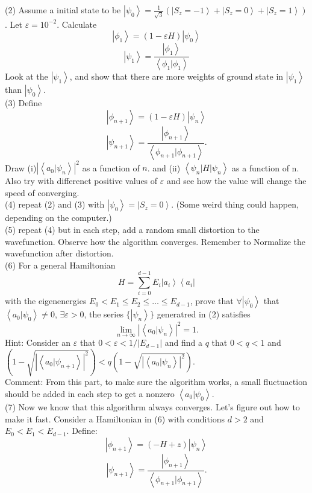 \documentclass[letterpaper,10pt]{article}
\begin{document}
\indent (2) Assume a initial state to be $\left|\psi_0\right>=\frac{1}{\sqrt{3}}(\left|S_z=-1\right>+\left|S_z=0\right>+\left|S_z=1\right>)$. Let $\varepsilon=10^{-2}$. Calculate 
$$\left|\phi_1\right>=\left(1-\varepsilon H \right)\left|\psi_0\right>$$
$$\left|\psi_1\right>=\frac{\left|\phi_1\right>}{\left<\phi_1|\phi_1\right>}$$
Look at the $\left|\psi_1\right>$, and show that  there are more weights of ground state in $\left|\psi_1\right>$ than $\left|\psi_0\right>$.\\
\indent (3) Define 
$$\left|\phi_{n+1}\right>=\left(1-\varepsilon H\right) \left|\psi_n\right>$$
$$\left|\psi_{n+1}\right>=\frac{\left|\phi_{n+1}\right>}{\left<\phi_{n+1}|\phi_{n+1}\right>}.$$
Draw (i)$\left|\left<a_0|\psi_n\right>\right|^2$ as a function of $n$. and 
(ii) $\left<\psi_n|H|\psi_n\right>$ as a function of n. Also try with differenct positive values of $\varepsilon$ and see how the value will change the speed of converging.\\
\indent (4) repeat (2) and (3) with $\left|\psi_0\right>=\left|S_z=0\right>$. (Some weird thing could happen, depending on the computer.)\\ 
\indent (5) repeat (4) but in each step, add a random small distortion to the wavefunction. Observe how the algorithm converges. Remember to Normalize the wavefunction after distortion. \\ 
\indent (6) For a general Hamiltonian
$$ H = \sum_{i=0}^{d-1} E_{i} \left|a_i\right>\left<a_i\right|
$$
with the eigenenergies $E_0<E_1\leq E_2 \leq \ldots\leq E_{d-1}$, prove that $\forall \left|\psi_0\right> $ that $\left<a_0|\psi_0\right>\neq 0$, $\exists \varepsilon>0$, the series $\{\left| \psi_n\right>\}$ generatred in (2) satisfies $$
\lim_{n\rightarrow\infty} \left|\left<a_0|\psi_n\right>\right|^2=1.
$$
\indent Hint: Consider an $\varepsilon$ that $0<\varepsilon<1/|E_{d-1}|$ and find a $q$ that $0<q<1$ and $\left(1-\sqrt{\left|\left<a_0|\psi_{n+1}\right>\right|^2}\right)<q\left(1-\sqrt{\left|\left<a_0|\psi_{n}\right>\right|^2}\right)$.\\
\indent Comment: From this part, to make sure the algorithm works, a small fluctuaction should be added in each step to get a nonzero $\left<a_0|\psi_0\right>$.\\
\indent (7) Now we know that this algorithrm always converges. Let's figure out how to make it fast. Consider a Hamiltonian in (6) with conditions $d>2$ and $E_0<E_1<E_{d-1}$. Define:$$\left|\phi_{n+1}\right>=\left(-H+z\right) \left|\psi_n\right>$$
$$\left|\psi_{n+1}\right>=\frac{\left|\phi_{n+1}\right>}{\left<\phi_{n+1}|\phi_{n+1}\right>}.$$
\end{document}
